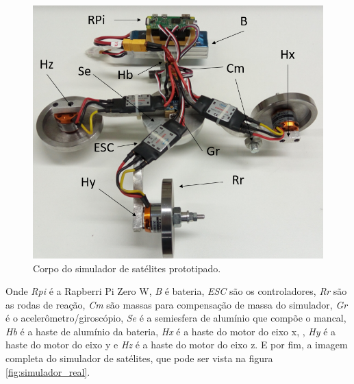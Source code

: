 \begin{figure}[H]
  \caption{Corpo do simulador de satélites prototipado.}
  \begin{center}
      \includegraphics[scale=.65]{metodologia/img/corpo_real}
  \end{center}
  \label{fig:corpo_real}
\end{figure}

Onde \textit{Rpi} é a Rapberri Pi Zero W, \textit{B} é bateria, \textit{ESC} são os controladores, \textit{Rr} são as rodas de reação, \textit{Cm} são massas para compensação de massa do simulador, \textit{Gr} é o acelerômetro/giroscópio, \textit{Se} é a semiesfera de alumínio que compõe o mancal, \textit{Hb} é a haste de alumínio da bateria, \textit{Hx} é a haste do motor do eixo x, , \textit{Hy} é a haste do motor do eixo y e \textit{Hz} é a haste do motor do eixo z. E por fim, a imagem completa do simulador de satélites, que pode ser vista na figura \ref{fig:simulador_real}.

